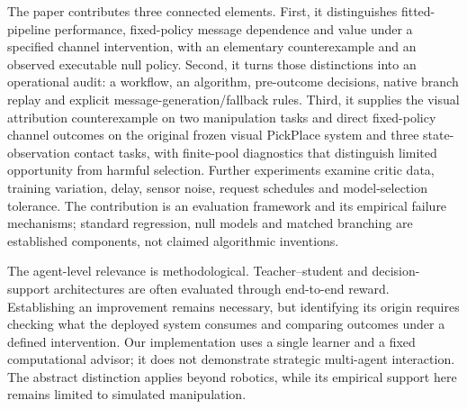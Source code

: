 The paper contributes three connected elements. First, it distinguishes fitted-pipeline performance, fixed-policy message dependence and value under a specified channel intervention, with an elementary counterexample and an observed executable null policy. Second, it turns those distinctions into an operational audit: a workflow, an algorithm, pre-outcome decisions, native branch replay and explicit message-generation/fallback rules. Third, it supplies the visual attribution counterexample on two manipulation tasks and direct fixed-policy channel outcomes on the original frozen visual PickPlace system and three state-observation contact tasks, with finite-pool diagnostics that distinguish limited opportunity from harmful selection. Further experiments examine critic data, training variation, delay, sensor noise, request schedules and model-selection tolerance. The contribution is an evaluation framework and its empirical failure mechanisms; standard regression, null models and matched branching are established components, not claimed algorithmic inventions.

The agent-level relevance is methodological. Teacher--student and decision-support architectures are often evaluated through end-to-end reward. Establishing an improvement remains necessary, but identifying its origin requires checking what the deployed system consumes and comparing outcomes under a defined intervention. Our implementation uses a single learner and a fixed computational advisor; it does not demonstrate strategic multi-agent interaction. The abstract distinction applies beyond robotics, while its empirical support here remains limited to simulated manipulation.
